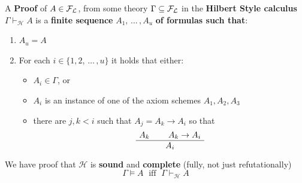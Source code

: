 
A \textbf{Proof} of $A \in \mathcal{F}_\mathcal{L}$, from some theory $\Gamma \subseteq \mathcal{F}_\mathcal{L}$ in the \textbf{Hilbert Style calculus} $\Gamma \vdash_\mathcal{H} A$ is a \textbf{finite sequence} $A_1 , \, \dots \, , A_u$ \textbf{of formulas such that}:
\begin{enumerate}
	\item $A_u = A$
	\item For each $i \in \{1,2, \, \dots \, , u\}$ it holds that either:
	\begin{itemize}
		\item $A_i \in \Gamma$, or
		\item $A_i$ is an instance of one of the axiom schemes $A_1, A_2, A_3$
		\item there are $j,k < i$ such that $A_j = A_k \rightarrow A_i$ so that
		$$
		  \AxiomC{$A_k$}
		  \AxiomC{$A_k \rightarrow A_i$}
		  \BinaryInfC{$A_i$}
		  \DisplayProof
		$$
	\end{itemize}
\end{enumerate}

\noindent
We have proof that $\mathcal{H}$ is \textbf{sound} and \textbf{complete} (fully, not just refutationally)
$$ \Gamma \models A \; \text{ iff } \; \Gamma \vdash_\mathcal{H} A $$

